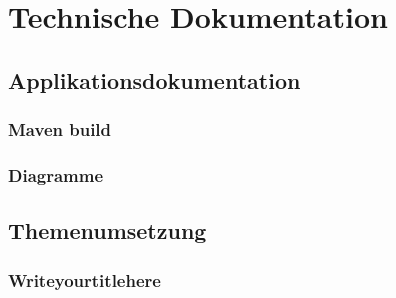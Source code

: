 \chapter{Technische Dokumentation}

\section{Applikationsdokumentation}

\subsection{Maven build}

\subsection{Diagramme}

\section{Themenumsetzung}

\subsection{Writeyourtitlehere}